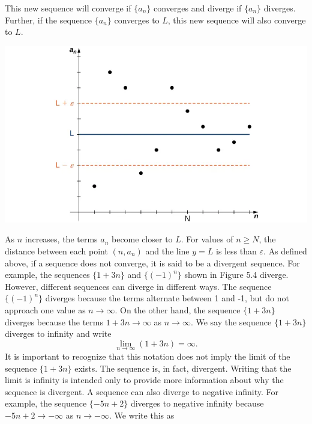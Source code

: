 \documentclass{report}
\begin{document}
    \bigbreak \noindent 
    This new sequence will converge if \( \{a_n\} \) converges and diverge if \( \{a_n\} \) diverges. Further, if the sequence \( \{a_n\} \) converges to \( L \), this new sequence will also converge to \( L \).
    \bigbreak \noindent 
    \begin{center}
        \includegraphics[scale=0.5]{./figures/mane8.png}
    \end{center}
    \bigbreak \noindent 
    As \( n \) increases, the terms \( a_n \) become closer to \( L \). For values of \( n \geq N \), the distance between each point \( (n, a_n) \) and the line \( y = L \) is less than \( \varepsilon \).
    \pagebreak \bigbreak \noindent 
    As defined above, if a sequence does not converge, it is said to be a divergent sequence. For example, the sequences \( \{1+3n\} \) and \( \{(-1)^n\} \) shown in Figure 5.4 diverge. However, different sequences can diverge in different ways. The sequence \( \{(-1)^n\} \) diverges because the terms alternate between 1 and -1, but do not approach one value as \( n \to \infty \). On the other hand, the sequence \( \{1+3n\} \) diverges because the terms \( 1+3n \to \infty \) as \( n \to \infty \). We say the sequence \( \{1+3n\} \) diverges to infinity and write
    \bigbreak \noindent 
    \[
    \lim_{{n \to \infty}} (1+3n) = \infty.
    \]
    \bigbreak \noindent 
    It is important to recognize that this notation does not imply the limit of the sequence \( \{1+3n\} \) exists. The sequence is, in fact, divergent. Writing that the limit is infinity is intended only to provide more information about why the sequence is divergent. A sequence can also diverge to negative infinity. For example, the sequence \( \{-5n+2\} \) diverges to negative infinity because \( -5n+2 \to -\infty \) as \( n \to -\infty \). We write this as
    \bigbreak \noindent 
\end{document}
